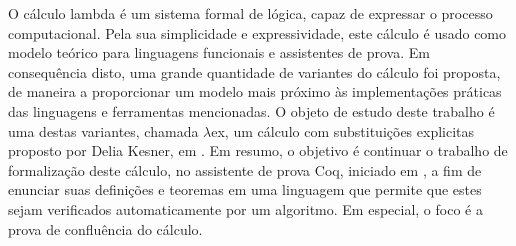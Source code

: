O cálculo lambda é um sistema formal de lógica, capaz de expressar o processo computacional.
Pela sua simplicidade e expressividade, este cálculo é usado como modelo teórico
para linguagens funcionais e assistentes de prova. Em consequência disto, 
uma grande quantidade de variantes do cálculo foi proposta, de maneira a proporcionar
um modelo mais próximo às implementações práticas das linguagens e ferramentas mencionadas.
O objeto de estudo deste trabalho é uma destas variantes, chamada $\lambda$ex,
um cálculo com substituições explicitas proposto por Delia Kesner, em \cite{delia}.
Em resumo, o objetivo é continuar o trabalho de formalização
deste cálculo, no assistente de prova Coq, iniciado em \cite{initial}, a fim de enunciar suas definições e teoremas 
em uma linguagem que permite que estes sejam verificados automaticamente por um algoritmo.
Em especial, o foco é a prova de confluência do cálculo.

